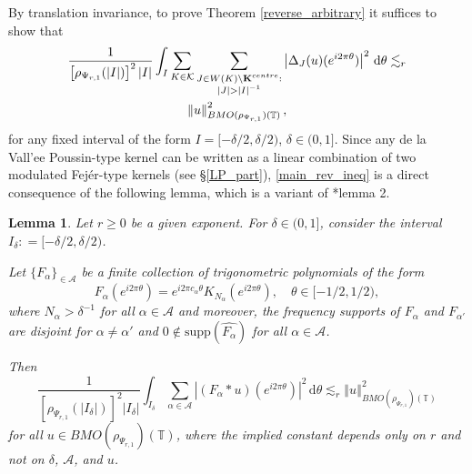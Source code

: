 \documentclass[a4paper, leqno, 10pt]{amsart}
\numberwithin{equation}{section}
\newtheorem{lemma}[thm]{Lemma}
\newcommand{\dd}{\mathrm{d}}
\newcommand{\T}{\mathbb{T}}
\newcommand{\norm}[1]{\left\Vert#1\right\Vert}
\begin{document}
By translation invariance, to prove Theorem \ref{reverse_arbitrary} it suffices to show that
\begin{multline}\label{main_rev_ineq}
\frac{1} { \left[ \rho_{\Psi_{r,1}} (|I|) \right]^2 |I|} \int_I \sum_{K \in \mathcal{K}}   \sum_{\substack{J \in W (K) \setminus \mathbf{K}^{\rm centre} : \\ |J| > |I|^{-1}}} \left| \Delta_J (u) (e^{i 2 \pi \theta}) \right|^2 \, \dd \theta \lesssim_r \\
\norm{ u }^2_{BMO (\rho_{\Psi_{r,1}}) (\T)},
\end{multline}
for any fixed interval of the form $I = [-\delta/2, \delta/2) $, $\delta \in (0,1] $. Since any de la Vall'ee Poussin-type kernel can be written as a linear combination of two modulated Fej\'er-type kernels (see \S \ref{LP_part}), \eqref{main_rev_ineq} is a direct consequence of the following lemma, which is a variant of \cite{B_SF}*{lemma 2}.

\begin{lemma}\label{reverse_arbitrary_Fejer}
Let $r \geq 0$ be a given exponent. For $\delta \in (0,1] $, consider the interval $I_{\delta} : = [-\delta/2, \delta/2) $. 

Let $\{ F_{\alpha} \}_{\in \mathcal{A}}$ be a finite collection of trigonometric polynomials of the form
\[
F_{\alpha} (e^{i 2 \pi \theta} ) = e^{i 2 \pi c_{\alpha} \theta} K_{N_{\alpha}} (e^{i 2 \pi \theta}), \quad \theta \in [-1/2, 1/2),
\]
where $N_{\alpha} > \delta^{-1}$ for all $\alpha \in \mathcal{A}$ and moreover, the frequency supports of $F_{\alpha}$ and $F_{\alpha'}$ are disjoint for $\alpha \neq \alpha'$ and $0 \notin \mathrm{supp} (\widehat{F_{\alpha}})$ for all $\alpha \in \mathcal{A}$.   

Then 
\[
\frac{1} { \left[ \rho_{\Psi_{r,1}} (|I_{\delta}|) \right]^2 |I_{\delta}|} \int_{I_{\delta}} \sum_{\alpha \in \mathcal{A}} \left| ( F_{\alpha} \ast u) (e^{i 2 \pi \theta}) \right|^2 \, \dd \theta \lesssim_r \norm{ u }^2_{BMO (\rho_{\Psi_{r,1}}) (\T)}
\]
for all $u \in BMO (\rho_{\Psi_{r,1}}) (\T)$, where the implied constant depends only on $r$ and not on $\delta$, $\mathcal{A}$, and $u$. 
\end{lemma}
\end{document}
